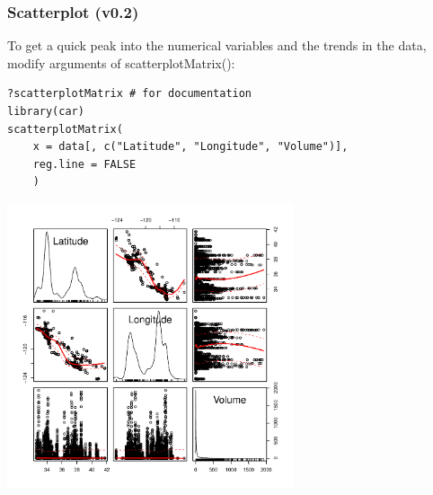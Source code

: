 \begin{frame}
\frametitle{Scatterplot (v0.2)}

To get a quick peak into the numerical variables and the trends in the data, modify arguments of \ttfamily scatterplotMatrix(): \normalfont
  		\begin{lstlisting}
?scatterplotMatrix # for documentation
library(car)		
scatterplotMatrix(
	x = data[, c("Latitude", "Longitude", "Volume")], 
	reg.line = FALSE
	)
		\end{lstlisting}

        \begin{center}
         \includegraphics[width=0.63\textwidth]{images/scatterPlot_v1.pdf}
        \end{center}
\end{frame}

